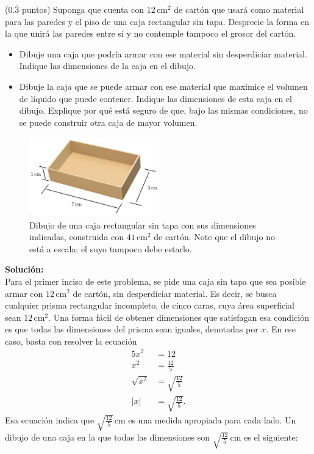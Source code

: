 \documentclass{fmbvecto}
\begin{document}
\begin{problema}
    
    (\(0.\bar{3}\) puntos) Suponga que cuenta con \(12 \, \mathrm{cm}^2 \) de cartón que usará como material para las paredes y el piso de una caja rectangular sin tapa. Desprecie la forma en la que unirá las paredes entre sí y no contemple tampoco el grosor del cartón.
    \begin{itemize}
        \item Dibuje una caja que podría armar con ese material sin desperdiciar material. Indique las dimensiones de la caja en el dibujo.
        \item Dibuje la caja que se puede armar con ese material que maximice el volumen de líquido que puede contener. Indique las dimensiones de esta caja en el dibujo. Explique por qué está seguro de que, bajo las mismas condiciones, no se puede construir otra caja de mayor volumen.
    \end{itemize}
    \begin{figure}[H]
        \centering
        \includegraphics[width=0.5\textwidth]{caja.png}
        \caption{Dibujo de una caja rectangular sin tapa con sus dimensiones indicadas, construida con \(41 \, \mathrm{cm}^2 \) de cartón. Note que el dibujo no está a escala; el suyo tampoco debe estarlo.}
    \end{figure}
        

\vspace{1em}
\tcblower
\textbf{Solución:}\\

Para el primer inciso de este problema, se pide una caja sin tapa que sea posible armar con \(12 \, \mathrm{cm}^2 \) de cartón, sin desperdiciar material. Es decir, se busca cualquier prisma rectangular incompleto, de cinco caras, cuya área superficial sean \(12 \, \mathrm{cm}^2 \). Una forma fácil de obtener dimensiones que satisfagan esa condición es que todas las dimensiones del prisma sean iguales, denotadas por \(x\). En ese caso, basta con resolver la ecuación
\begin{align*}
    5x^2 &= 12 \\
    x^2 &= \frac{12}{5} \\
    \sqrt{x^2} &= \sqrt{\frac{12}{5}} \\
    |x| &= \sqrt{\frac{12}{5}}.
\end{align*}
Esa ecuación indica que \(\sqrt{\frac{12}{5}} \, \mathrm{cm}\) es una medida apropiada para cada lado. Un dibujo de una caja en la que todas las dimensiones son \(\sqrt{\frac{12}{5}} \, \mathrm{cm}\) es el siguiente:


\end{problema}
\end{document}
